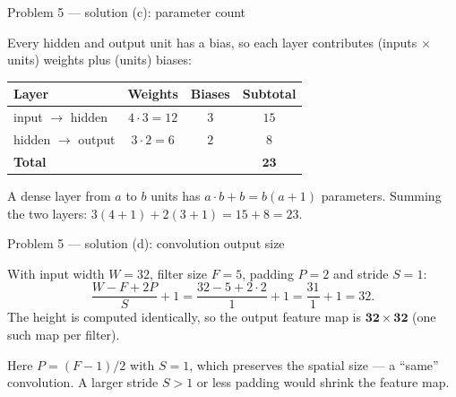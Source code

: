 \documentclass[aspectratio=169,11pt]{beamer}
\begin{document}
\begin{frame}{Problem 5 --- solution (c): parameter count}
  \begin{solutionbox}
    Every hidden and output unit has a bias, so each layer contributes
    (inputs $\times$ units) weights plus (units) biases:
    \begin{center}
    \begin{tabular}{@{}lccc@{}}
      \toprule
      Layer & Weights & Biases & Subtotal\\
      \midrule
      input $\to$ hidden & $4\cdot3=12$ & $3$ & $15$\\
      hidden $\to$ output & $3\cdot2=6$ & $2$ & $8$\\
      \midrule
      \textbf{Total} & & & $\mathbf{23}$\\
      \bottomrule
    \end{tabular}
    \end{center}
  \end{solutionbox}
  \begin{takeaway}
    \footnotesize A dense layer from $a$ to $b$ units has $a\cdot b+b=b(a{+}1)$ parameters. Summing
    the two layers: $3(4{+}1)+2(3{+}1)=15+8=23$.
  \end{takeaway}
\end{frame}

\begin{frame}{Problem 5 --- solution (d): convolution output size}
  \begin{solutionbox}
    With input width $W=32$, filter size $F=5$, padding $P=2$ and stride $S=1$:
    \[
      \frac{W-F+2P}{S}+1=\frac{32-5+2\cdot2}{1}+1=\frac{31}{1}+1=32 .
    \]
    The height is computed identically, so the output feature map is $\mathbf{32\times32}$
    (one such map per filter).
  \end{solutionbox}
  \begin{takeaway}
    \footnotesize Here $P=(F-1)/2$ with $S=1$, which preserves the spatial size --- a ``same''
    convolution. A larger stride $S>1$ or less padding would shrink the feature map.
  \end{takeaway}
\end{frame}
\end{document}

